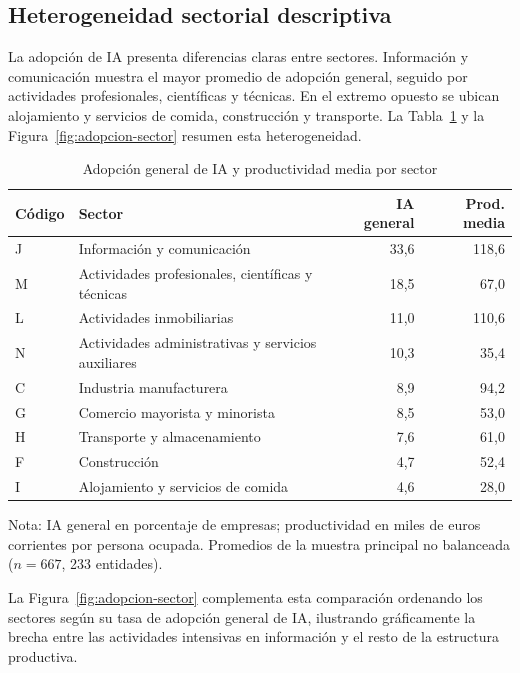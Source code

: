 \documentclass[12pt,a4paper]{article}
\begin{document}
\subsection{Heterogeneidad sectorial descriptiva}

La adopción de IA presenta diferencias claras entre sectores. Información y comunicación muestra el mayor promedio de adopción general, seguido por actividades profesionales, científicas y técnicas. En el extremo opuesto se ubican alojamiento y servicios de comida, construcción y transporte. La Tabla~\ref{tab:sectores-resultados} y la Figura~\ref{fig:adopcion-sector} resumen esta heterogeneidad.

\begin{table}[H]
\centering
\caption{Adopción general de IA y productividad media por sector}
\label{tab:sectores-resultados}
\small
\begin{tabularx}{\textwidth}{lXrr}
\toprule
\textbf{Código} & \textbf{Sector} & \textbf{IA general} & \textbf{Prod. media} \\
\midrule
J & Información y comunicación & 33,6 & 118,6 \\
M & Actividades profesionales, científicas y técnicas & 18,5 & 67,0 \\
L & Actividades inmobiliarias & 11,0 & 110,6 \\
N & Actividades administrativas y servicios auxiliares & 10,3 & 35,4 \\
C & Industria manufacturera & 8,9 & 94,2 \\
G & Comercio mayorista y minorista & 8,5 & 53,0 \\
H & Transporte y almacenamiento & 7,6 & 61,0 \\
F & Construcción & 4,7 & 52,4 \\
I & Alojamiento y servicios de comida & 4,6 & 28,0 \\
\bottomrule
\end{tabularx}
\begin{flushleft}
\footnotesize Nota: IA general en porcentaje de empresas; productividad en miles de euros corrientes por persona ocupada. Promedios de la muestra principal no balanceada ($n=667$, 233 entidades).
\end{flushleft}
\end{table}

La Figura~\ref{fig:adopcion-sector} complementa esta comparación ordenando los sectores según su tasa de adopción general de IA, ilustrando gráficamente la brecha entre las actividades intensivas en información y el resto de la estructura productiva.
\end{document}
